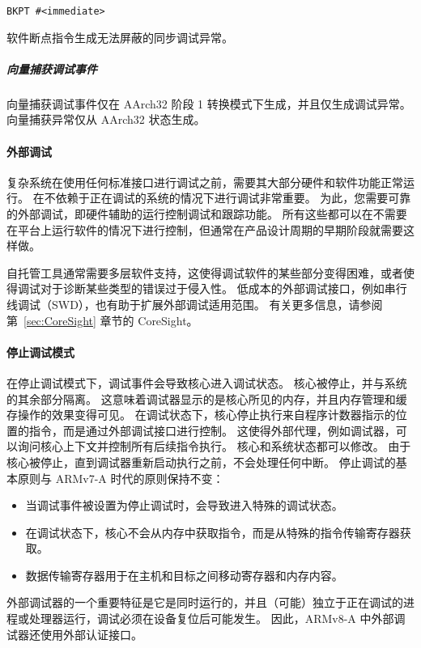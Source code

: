 \lstinline!BKPT #<immediate>!

软件断点指令生成无法屏蔽的同步调试异常。

\subparagraph*{向量捕获调试事件}

向量捕获调试事件仅在 AArch32 阶段 1 转换模式下生成，并且仅生成调试异常。
向量捕获异常仅从 AArch32 状态生成。

\paragraph*{外部调试}

复杂系统在使用任何标准接口进行调试之前，需要其大部分硬件和软件功能正常运行。
在不依赖于正在调试的系统的情况下进行调试非常重要。
为此，您需要可靠的外部调试，即硬件辅助的运行控制调试和跟踪功能。
所有这些都可以在不需要在平台上运行软件的情况下进行控制，但通常在产品设计周期的早期阶段就需要这样做。

自托管工具通常需要多层软件支持，这使得调试软件的某些部分变得困难，或者使得调试对于诊断某些类型的错误过于侵入性。
低成本的外部调试接口，例如串行线调试（SWD），也有助于扩展外部调试适用范围。
有关更多信息，请参阅第~\ref{sec:CoreSight} 章节的 CoreSight。

\paragraph*{停止调试模式}

在停止调试模式下，调试事件会导致核心进入调试状态。
核心被停止，并与系统的其余部分隔离。
这意味着调试器显示的是核心所见的内存，并且内存管理和缓存操作的效果变得可见。
在调试状态下，核心停止执行来自程序计数器指示的位置的指令，而是通过外部调试接口进行控制。
这使得外部代理，例如调试器，可以询问核心上下文并控制所有后续指令执行。
核心和系统状态都可以修改。
由于核心被停止，直到调试器重新启动执行之前，不会处理任何中断。
停止调试的基本原则与 ARMv7-A 时代的原则保持不变：

\begin{itemize}
\item
  当调试事件被设置为停止调试时，会导致进入特殊的调试状态。
\item
  在调试状态下，核心不会从内存中获取指令，而是从特殊的指令传输寄存器获取。
\item
  数据传输寄存器用于在主机和目标之间移动寄存器和内存内容。
\end{itemize}

外部调试器的一个重要特征是它是同时运行的，并且（可能）独立于正在调试的进程或处理器运行，调试必须在设备复位后可能发生。
因此，ARMv8-A 中外部调试器还使用外部认证接口。

